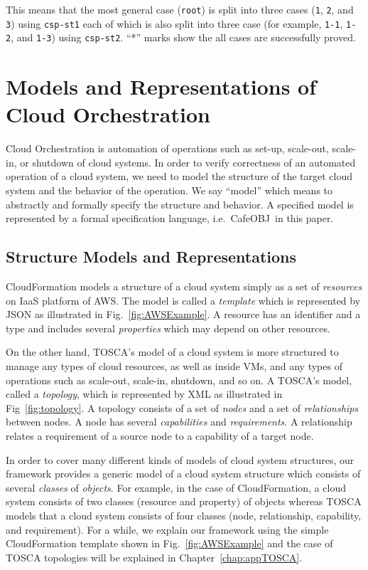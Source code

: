 \documentclass[12pt]{report}
\newcommand{\cafeobj}{{\sf CafeOBJ}~}
\begin{document}
This means that the most general case ({\tt root}) is split into three
cases ({\tt 1}, {\tt 2}, and {\tt 3}) using {\tt csp-st1} each of
which is also split into three case (for example, {\tt 1-1},
{\tt 1-2}, and {\tt 1-3}) using {\tt csp-st2}.  ``*'' marks show the
all cases are successfully proved.

\chapter{Models and Representations of Cloud Orchestration}
\label{chap:model}
Cloud Orchestration is automation of operations such as set-up,
scale-out, scale-in, or shutdown of cloud systems. In order to verify
correctness of an automated operation of a cloud system, we need to
model the structure of the target cloud system and the behavior of the
operation. We say ``model'' which means to abstractly and formally
specify the structure and behavior. A specified model is represented
by a formal specification language, i.e.\ \cafeobj in this paper.

\section{Structure Models and Representations}
\label{sec:structuremodel}
CloudFormation models a structure of a cloud system simply as a set
of {\it resources} on IaaS platform of AWS. The model is called a {\it
  template} which is represented by JSON as illustrated in
Fig.~\ref{fig:AWSExample}.  A resource has an identifier and a type
and includes several {\it properties} which may depend on other
resources.

On the other hand, TOSCA's model of a cloud system is more structured
to manage any types of cloud resources, as well as inside VMs, and any
types of operations such as scale-out, scale-in, shutdown, and so on.
A TOSCA's model, called a {\it topology}, which is represented by XML
as illustrated in Fig~\ref{fig:topology}. A topology consists of a set
of {\it nodes} and a set of {\it relationships} between nodes. A node
has several {\it capabilities} and {\it requirements}. A relationship
relates a requirement of a source node to a capability of a target
node.

In order to cover many different kinds of models of cloud system
structures, our framework provides a generic model of a cloud system
structure which consists of several {\it classes} of {\it
  objects}. For example, in the case of CloudFormation, a cloud system
consists of two classes (resource and property) of objects whereas
TOSCA models that a cloud system consists of four classes (node,
relationship, capability, and requirement). For a while, we explain
our framework using the simple CloudFormation template shown in
Fig.~\ref{fig:AWSExample} and the case of TOSCA topologies will be
explained in Chapter~\ref{chap:appTOSCA}.
\end{document}
